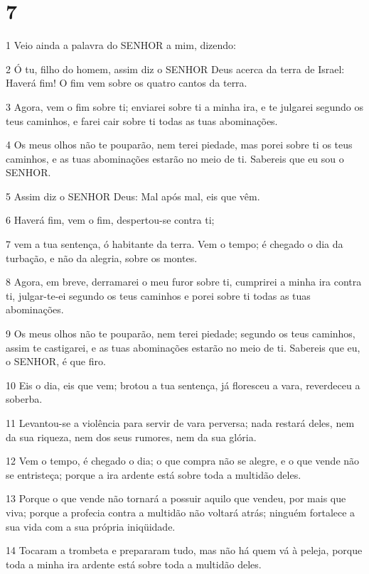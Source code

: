 \chapter{7}

\par 1 Veio ainda a palavra do SENHOR a mim, dizendo:
\par 2 Ó tu, filho do homem, assim diz o SENHOR Deus acerca da terra de Israel: Haverá fim! O fim vem sobre os quatro cantos da terra.
\par 3 Agora, vem o fim sobre ti; enviarei sobre ti a minha ira, e te julgarei segundo os teus caminhos, e farei cair sobre ti todas as tuas abominações.
\par 4 Os meus olhos não te pouparão, nem terei piedade, mas porei sobre ti os teus caminhos, e as tuas abominações estarão no meio de ti. Sabereis que eu sou o SENHOR.
\par 5 Assim diz o SENHOR Deus: Mal após mal, eis que vêm.
\par 6 Haverá fim, vem o fim, despertou-se contra ti;
\par 7 vem a tua sentença, ó habitante da terra. Vem o tempo; é chegado o dia da turbação, e não da alegria, sobre os montes.
\par 8 Agora, em breve, derramarei o meu furor sobre ti, cumprirei a minha ira contra ti, julgar-te-ei segundo os teus caminhos e porei sobre ti todas as tuas abominações.
\par 9 Os meus olhos não te pouparão, nem terei piedade; segundo os teus caminhos, assim te castigarei, e as tuas abominações estarão no meio de ti. Sabereis que eu, o SENHOR, é que firo.
\par 10 Eis o dia, eis que vem; brotou a tua sentença, já floresceu a vara, reverdeceu a soberba.
\par 11 Levantou-se a violência para servir de vara perversa; nada restará deles, nem da sua riqueza, nem dos seus rumores, nem da sua glória.
\par 12 Vem o tempo, é chegado o dia; o que compra não se alegre, e o que vende não se entristeça; porque a ira ardente está sobre toda a multidão deles.
\par 13 Porque o que vende não tornará a possuir aquilo que vendeu, por mais que viva; porque a profecia contra a multidão não voltará atrás; ninguém fortalece a sua vida com a sua própria iniqüidade.
\par 14 Tocaram a trombeta e prepararam tudo, mas não há quem vá à peleja, porque toda a minha ira ardente está sobre toda a multidão deles.
